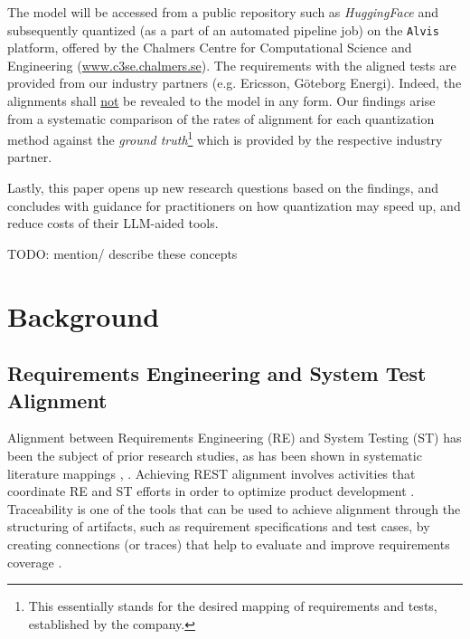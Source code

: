 \documentclass[conference]{IEEEtran}
\begin{document}
The model will be accessed from a public repository such as \textit{HuggingFace}
and subsequently quantized (as a part of an automated pipeline job) on the
\verb|Alvis| platform, offered by the Chalmers Centre for Computational Science
and Engineering (\url{www.c3se.chalmers.se}).
The requirements with the aligned tests are provided from our industry partners
(e.g. Ericsson, G\"oteborg Energi). Indeed, the alignments shall
\underline{not} be revealed to the model in any form. Our findings arise from a
systematic comparison of the rates of alignment for each quantization method
against the \textit{ground truth}\footnote{This essentially stands for the
desired mapping of requirements and tests, established by the company.} which is
provided by the respective industry partner.

Lastly, this paper opens up new research questions based on the findings, and
concludes with guidance for practitioners on how quantization may speed up, and
reduce costs of their LLM-aided tools.

TODO: mention/ describe these concepts

\section{Background}\label{background}

\subsection{Requirements Engineering and System Test Alignment}

Alignment between Requirements Engineering (RE) and System Testing (ST) has been the subject of prior research studies, as has been shown in systematic literature mappings \cite{barmi2011Alignment}, \cite{karhapaa_what_2017}. Achieving REST alignment involves activities that coordinate RE and ST efforts in order to optimize product development \cite{unterkalmsteinerTaxonomyRequirementsEngineering2014}. Traceability is one of the tools that can be used to achieve alignment through the structuring of artifacts, such as requirement specifications and test cases, by creating connections (or traces) that help to evaluate and improve requirements coverage \cite{bjarnason2014Challenges}.
\end{document}
